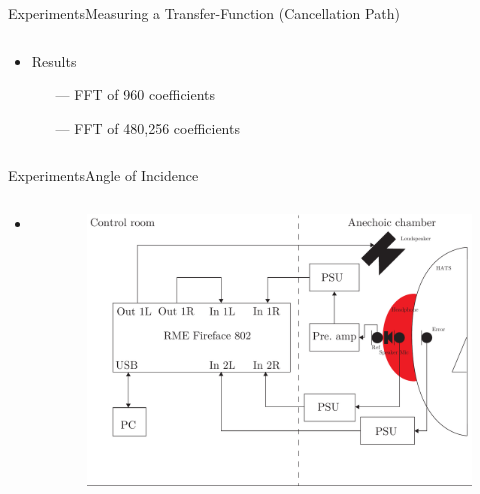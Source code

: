 \begin{frame}{Experiments}{Measuring a Transfer-Function (Cancellation Path)}		
	\begin{columns}
		\begin{column}{0.3\textwidth}
			\begin{itemize}
				\item Results
				\begin{itemize}
					\item[\textcolor{MATLABorange}{---}] FFT of 960 coefficients
					\item[\textcolor{MATLABblue}{---}] FFT of 480,256 coefficients
				\end{itemize}
			\end{itemize}
		\end{column}
		\begin{column}{0.7\textwidth} 
			\begin{figure}[h]
				
			\end{figure}
		\end{column}
	\end{columns}
\end{frame}


\begin{frame}{Experiments}{Angle of Incidence}		
	\begin{columns}
		\begin{column}{0.5\textwidth}
			\begin{itemize}
				\item hej
			\end{itemize}
		\end{column}
		\begin{column}{0.5\textwidth} 
			\begin{figure}[h]
				\includegraphics[width=1\textwidth]{figures/AngleOfIncidenceSetup.pdf}
			\end{figure}
		\end{column}
	\end{columns}
\end{frame}

